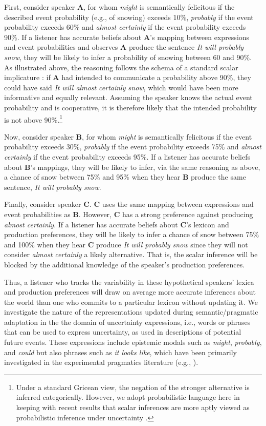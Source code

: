\documentclass[man, floatsintext]{apa6}
\begin{document}
First, consider speaker {\bf A}, for whom \textit{might} is semantically felicitous if the described event probability (e.g., of snowing) exceeds 10\%, 
\textit{probably} if the event probability exceeds 60\% and \textit{almost certainly}  if the event probability exceeds 90\%.  If a listener has accurate beliefs about {\bf A}'s mapping between expressions and event probabilities and observes {\bf A}  produce the sentence \emph{It will probably snow}, they will be likely to infer a probability of snowing between 60 and 90\%. As illustrated above, the reasoning follows the schema of a standard scalar implicature \parencite{Grice1975, Horn1984}: if  {\bf A} had intended to communicate a probability above 90\%, they could have said \emph{It will almost certainly snow}, which would have been more informative and equally relevant. Assuming the speaker knows the actual event probability and is cooperative, it is therefore likely that the intended probability is not above 90\%.\footnote{Under a standard Gricean view, the negation of the stronger alternative is inferred categorically. However, we adopt probabilistic language here in keeping with recent results that scalar inferences are more aptly viewed as probabilistic inference under uncertainty \parencite{Goodman2013}.} 

Now, consider speaker {\bf B}, for whom \textit{might} is semantically felicitous if the event probability exceeds 30\%, 
\textit{probably} if the event probability exceeds 75\% and \textit{almost certainly}  if the event probability exceeds 95\%. If a listener has
accurate beliefs about {\bf B}'s mappings, they will be likely to infer, via the same reasoning as above, a chance of snow between 75\% and 95\% when they hear {\bf B} produce the same sentence, \textit{It will probably snow}.

Finally, consider speaker {\bf C}. {\bf C} uses the same mapping between expressions and event probabilities as {\bf B}. However, {\bf C} has a strong preference against 
producing \textit{almost certainly}. If a listener has accurate beliefs about {\bf C}'s lexicon and production preferences, 
they will be likely to infer a chance of snow between 75\% and 100\% when they hear {\bf C} produce \textit{It will probably snow} since they will not
consider  \textit{almost certainly} a likely alternative. That is, the scalar inference will be blocked by the additional knowledge of the speaker's production preferences. 

Thus, a listener who tracks the variability in these hypothetical speakers' lexica and production preferences will draw on average more accurate inferences about the world than one who commits to a particular lexicon without updating it. We investigate the nature of the representations updated during semantic/pragmatic adaptation in the the domain of uncertainty expressions, i.e., words or phrases that can be used to express uncertainty, as used in descriptions of potential future events. These expressions include epistemic modals such as \textit{might}, 
\textit{probably}, and \textit{could} \parencite[see, for example,][]{Kratzer1991,Hacquard2011} but also phrases such as \textit{it looks like}, which have been primarily investigated in the experimental pragmatics literature (e.g., \cite{Kurumada2014,Pogue2018}).
\end{document}
